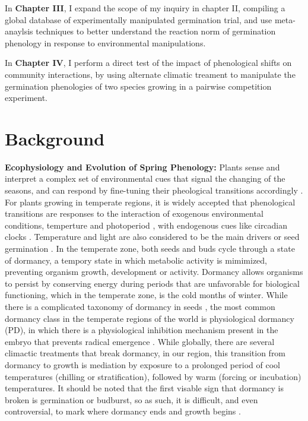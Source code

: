 \documentclass{article}\usepackage[]{graphicx}\usepackage[]{color}
\begin{document}
\par In \textbf{Chapter III}, I expand the scope of my inquiry in chapter II, compiling a global database of experimentally manipulated germination trial, and use meta-anaylsis techniques to better understand the reaction norm of germination phenology in response to environmental manipulations.
\par In \textbf{Chapter IV}, I perform a direct test of the impact of phenological shifts on community interactions, by using alternate climatic treament to manipulate the germination phenologies of two species growing in a pairwise competition experiment.

\section*{Background}
\indent\indent\textbf{Ecophysiology and Evolution of Spring Phenology:} Plants sense and interpret a complex set of environmental cues that signal the changing of the seasons, and can respond by fine-tuning their pheological transitions accordingly \citep{Vitasse2010}. For plants growing in temperate regions, it is widely accepted that phenological transitions are responses to the interaction of exogenous environmental conditions, temperture and photoperiod \citep{Forrest2010}, with endogenous cues like circadian clocks \citep{Visser2010}. Temperature and light are also considered to be the main drivers or seed germination \citep{Finch-Savage2006}. In the temperate zone, both seeds and buds cycle through a state of dormancy, a tempory state in which metabolic activity is mimimized, preventing organism growth, development or activity. Dormancy allows organisms to persist by conserving energy during periods that are unfavorable for biological functioning, which in the temperate zone, is the cold months of winter. While there is a complicated taxonomy of dormancy in seeds \citep{Baskin2004}, the most common dormancy class in the temperate regions of the world is physiological dormancy (PD), in which there is a physiological inhibition mechanism present in the embryo that prevents radical emergence \citep{Finch-Savage2006}. While globally, there are several climactic treatments that break dormancy, in our region, this transition from dormancy to growth is mediation by exposure to a prolonged period of cool temperatures (chilling or stratification), followed by warm (forcing or incubation) temperatures. It should be noted that the first visable sign that dormancy is broken is germination or budburst, so as such, it is difficult, and even controversial, to mark where dormancy ends and growth begins \citep{Long2015,Bewley1997}.
\end{document}
